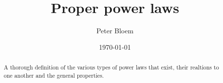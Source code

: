 \documentclass{article}
\title{Proper power laws}
\date{\today}
\author{Peter Bloem}
\begin{document}
\maketitle

\begin{abstract}
\noindent A thorough definition of the various types of power laws that exist, their realtions to one another and the general properties.
\end{abstract}
\end{document}
